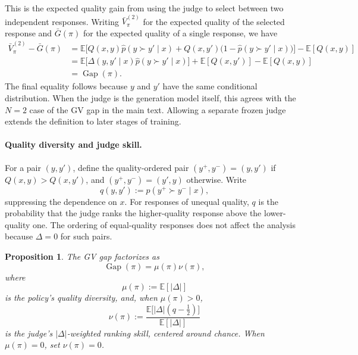 \documentclass{article}
\theoremstyle{plain}
\newtheorem{proposition}[theorem]{Proposition}
\theoremstyle{definition}
\theoremstyle{remark}
\DeclareMathOperator{\gap}{Gap}
\begin{document}
This is the expected quality gain from using the judge to select between two independent responses. Writing $\bar{V}^{(2)}_\pi$ for the expected quality of the selected response and $\bar{G}(\pi)$ for the expected quality of a single response, we have
\begin{align*}
  \bar{V}^{(2)}_\pi-\bar{G}(\pi)
  &= \mathbb{E}\Big[Q(x,y)\hat{p}(y\succ y'\mid x)+Q(x,y')\bigl(1-\hat{p}(y\succ y'\mid x)\bigr)\Big]-\mathbb{E}[Q(x,y)]\\
  &= \mathbb{E}\Big[\Delta(y,y'\mid x)\hat{p}(y\succ y'\mid x)\Big]+\mathbb{E}[Q(x,y')]-\mathbb{E}[Q(x,y)]\\
  &= \gap(\pi).
\end{align*}
The final equality follows because $y$ and $y'$ have the same conditional distribution. When the judge is the generation model itself, this agrees with the $N=2$ case of the GV gap in the main text. Allowing a separate frozen judge extends the definition to later stages of training.

\paragraph{Quality diversity and judge skill.}
For a pair $(y,y')$, define the quality-ordered pair $(y^+,y^-)=(y,y')$ if $Q(x,y)>Q(x,y')$, and $(y^+,y^-)=(y',y)$ otherwise. Write
\[
  q(y,y'):=\hat{p}(y^+\succ y^-\mid x),
\]
suppressing the dependence on $x$. For responses of unequal quality, $q$ is the probability that the judge ranks the higher-quality response above the lower-quality one. The ordering of equal-quality responses does not affect the analysis because $\Delta=0$ for such pairs.

\begin{proposition}
The GV gap factorizes as
\[
  \gap(\pi)=\mu(\pi)\nu(\pi),
\]
where
\[
  \mu(\pi):=\mathbb{E}[|\Delta|]
\]
is the policy's \emph{quality diversity}, and, when $\mu(\pi)>0$,
\[
  \nu(\pi):=\frac{\mathbb{E}\bigl[|\Delta|(q-\tfrac12)\bigr]}{\mathbb{E}[|\Delta|]}
\]
is the judge's $|\Delta|$-weighted \emph{ranking skill}, centered around chance. When $\mu(\pi)=0$, set $\nu(\pi)=0$.
\end{proposition}
\end{document}
